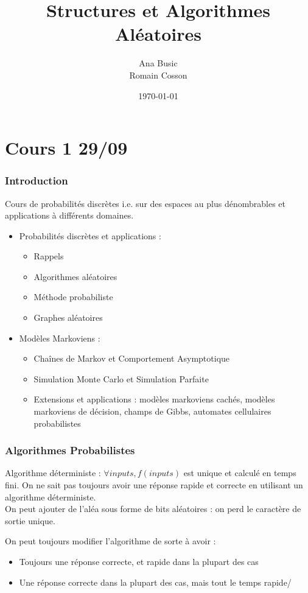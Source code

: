 \documentclass{cours}
\title{Structures et Algorithmes Aléatoires}
\author{Ana Busic \\ \small{Romain Cosson}}
\date{\today}
\begin{document}
\part{Cours 1 29/09}
\section*{Introduction}
Cours de probabilités discrètes i.e. sur des espaces au plus dénombrables et applications à différents domaines.
\begin{itemize}
    \item Probabilités discrètes et applications : 
    \begin{itemize}
        \item Rappels
        \item Algorithmes aléatoires
        \item Méthode probabiliste
        \item Graphes aléatoires    
    \end{itemize}
    \item Modèles Markoviens : 
    \begin{itemize}
        \item Chaînes de Markov et Comportement Asymptotique
        \item Simulation Monte Carlo et Simulation Parfaite
        \item Extensions et applications : modèles markoviens cachés, modèles markoviens de décision, champs de Gibbs, automates cellulaires probabilistes
    \end{itemize}
\end{itemize}

\section{Algorithmes Probabilistes}
Algorithme déterministe : $\forall inputs, f(inputs)$ est unique et calculé en temps fini. On ne sait pas toujours avoir une réponse rapide et correcte en utilisant un algorithme déterministe. \\
On peut ajouter de l'aléa sous forme de bits aléatoires : on perd le caractère de sortie unique.

On peut toujours modifier l'algorithme de sorte à avoir : \begin{itemize}
    \item Toujours une réponse correcte, et rapide dans la plupart des cas
    \item Une réponse correcte dans la plupart des cas, mais tout le temps rapide/ 
\end{itemize}
\end{document}
